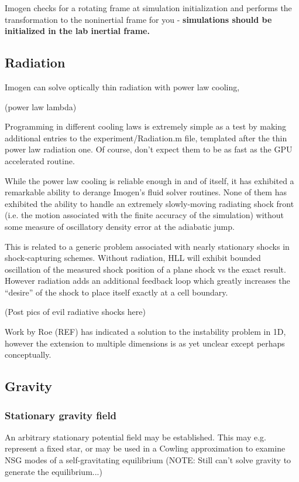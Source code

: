 \documentclass[letterpaper,12pt]{article}
\begin{document}
Imogen checks for a rotating frame at simulation initialization and performs the
transformation to the noninertial frame for you - \textbf{simulations should be initialized
in the lab inertial frame.}

\subsection{Radiation}

Imogen can solve optically thin radiation with power law cooling,

(power law lambda)

Programming in different cooling laws is extremely simple as a test by making additional
entries to the experiment/Radiation.m file, templated after the thin power law radiation
one. Of course, don't expect them to be as fast as the GPU accelerated routine.

While the power law cooling is reliable enough in and of itself, it has exhibited a
remarkable ability to derange Imogen's fluid solver routines. None of them has exhibited
the ability to handle an extremely slowly-moving radiating shock front (i.e. the motion
associated with the finite accuracy of the simulation) without some measure of oscillatory
density error at the adiabatic jump.

This is related to a generic problem associated with nearly stationary shocks in 
shock-capturing schemes. Without radiation, HLL will exhibit bounded oscillation of the
measured shock position of a plane shock vs the exact result. However radiation adds
an additional feedback loop which greatly increases the ``desire'' of the shock to
place itself exactly at a cell boundary.

(Post pics of evil radiative shocks here)

Work by Roe (REF) has indicated a solution to the instability problem in 1D,
however the extension to multiple dimensions is as yet unclear except perhaps conceptually.

\subsection{Gravity}

\subsubsection{Stationary gravity field}

An arbitrary stationary potential field may be established. This may e.g. represent
a fixed star, or may be used in a Cowling approximation to examine NSG modes of a
self-gravitating equilibrium (NOTE: Still can't solve gravity to generate the equilibrium...)
\end{document}

